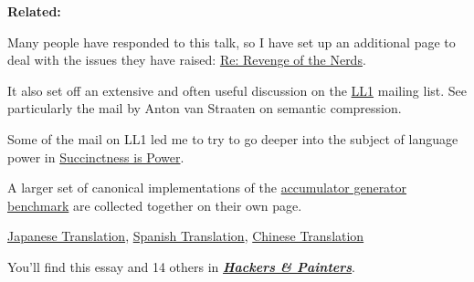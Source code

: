                   


                  \textbf{Related:}

Many people have responded to this
                  talk, so I have set up an additional page to deal with the
                  issues they have raised:
                  \href{http://www.paulgraham.com/icadmore.html}{Re: Revenge of the Nerds}.

It also set off an extensive and often useful
                  discussion on the
                  \href{http://www.ai.mit.edu/\textasciitilde{}gregs/ll1-discuss-archive-html/threads.html}{LL1}
                  mailing list. See particularly the mail by Anton van Straaten
                  on semantic compression.

Some of the mail on LL1
                  led me to try to go deeper into the subject of language power
                  in
                  \href{http://www.paulgraham.com/power.html}{Succinctness is Power}.

A
                  larger set of canonical implementations of the
                  \href{http://www.paulgraham.com/accgen.html}{accumulator generator benchmark} are
                  collected together on their own page.

\href{http://www.shiro.dreamhost.com/scheme/trans/icad-j.html}{Japanese Translation},
                  \href{http://kapcoweb.com/p/docs/translations/revenge\_of\_the\_nerds/revenge\_of\_the\_nerds-es.html}{Spanish Translation},
                  \href{http://flyingapplet.spaces.live.com/blog/cns!F682AFBD82F7E261!375.entry }{Chinese Translation}


              
            
          
            
              
                


                  
                  
                    
                      
                        
                          You'll find this essay and 14 others in
                          \href{http://www.amazon.com/gp/product/0596006624}{\textbf{\emph{Hackers \& Painters}}}.
                        

                      
                    

                    
              
            
          
